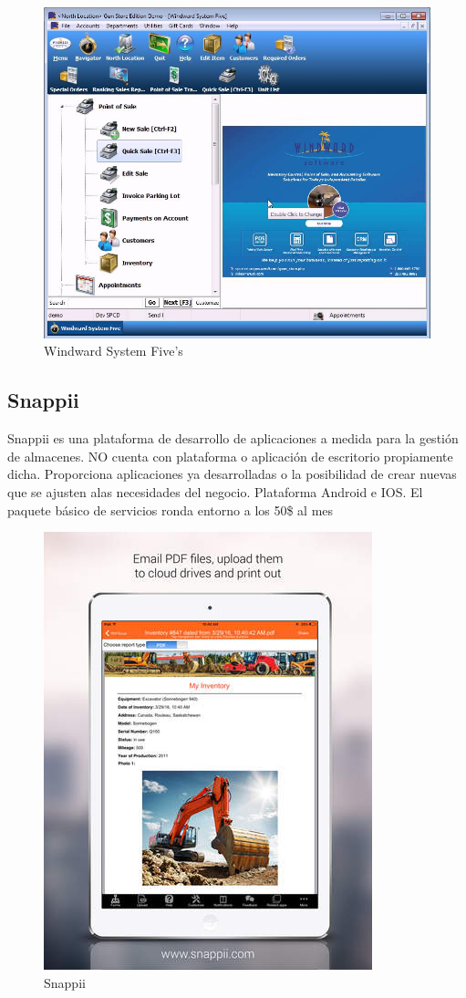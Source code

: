 \documentclass[a4paper,11pt]{book}
\begin{document}
\begin{figure}[htbpH]  
\centering 
\includegraphics[scale=0.35]{imagenes/estudioArte/five.jpg}
\caption{Windward System Five's}  
\end{figure}

\subsection{Snappii}

Snappii\cite{snp} es una plataforma de desarrollo de aplicaciones a medida para la gestión de almacenes. NO cuenta con plataforma o aplicación de escritorio propiamente dicha. Proporciona aplicaciones ya desarrolladas o la posibilidad de crear nuevas que se ajusten alas necesidades del negocio. Plataforma Android e IOS. El paquete básico de servicios ronda entorno a los 50\$ al mes

\begin{figure}[htbpH]  
\centering 
\includegraphics[scale=0.5]{imagenes/estudioArte/shapi.jpeg}
\caption{Snappii}  
\end{figure}
\end{document}
